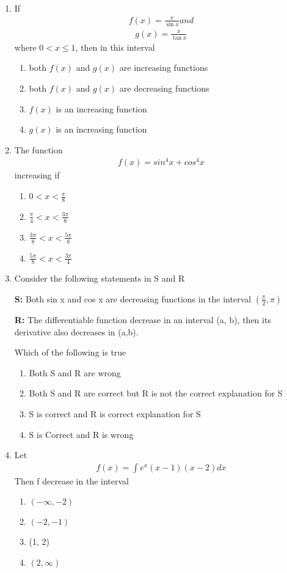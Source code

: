 \begin{enumerate}[label=\arabic*.,ref=\thesubsection.\theenumi]
\item If 
\begin{align*} 
f(x) = \frac{x}{\sin x} 
and 
\end{align*} 
\begin{align*}
g(x) = \frac{x}{\tan x}
\end{align*} 
where $0 < x \leq 1$, then in this interval
\begin{enumerate}
\item both $f(x)$ and $g(x)$ are increasing functions
\item both $f(x)$ and $g(x)$ are decreasing functions
\item $f(x)$ is an increasing function
\item $g(x)$ is an increasing function
\end{enumerate}

\item The function 
\begin{align*} 
f(x) = sin^4 x + cos^4x 
\end{align*} 
increasing if
\begin{enumerate}
\item $0 < x < \frac{\pi}{8}$
\item $\frac{\pi}{4} < x < \frac{3\pi}{8}$
\item $\frac{3\pi}{8} < x < \frac{5\pi}{8}$
\item $\frac{5\pi}{8} < x < \frac{3\pi}{4}$
\end{enumerate}

\item Consider the following statements in S and R

\textbf{S:} Both sin x and cos x are decreasing functions in the interval $(\frac{\pi}{2}, \pi)$

\textbf{R:} The differentiable function decrease in an interval (a, b), then its derivative also decreases in (a,b).

Which of the following is true
\begin{enumerate}
\item Both S and R are wrong
\item Both S and R are correct but R is not the correct explanation for S
\item S is correct and R is correct explanation for S 
\item S is Correct and R is wrong
\end{enumerate}

\item Let 
\begin{align*}
f(x) = \int e^x (x - 1)(x - 2)dx
\end{align*}
Then f decrease in the interval
\begin{enumerate}
\item $(-\infty, -2)$
\item $(-2, -1)$
\item (1, 2)
\item $(2, \infty)$
\end{enumerate}


\end{enumerate}
